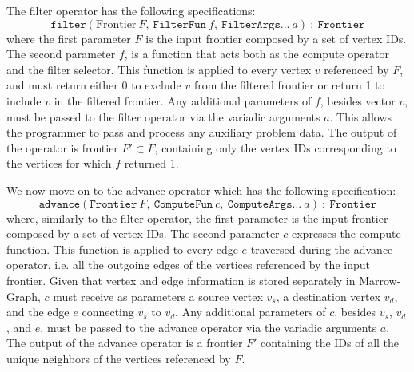 The filter operator has the following specifications:
%
\begin{displaymath}
\texttt{filter}(\text{Frontier} \: F, \: \texttt{FilterFun} \: f, \: \texttt{FilterArgs}... \: a) \: : \: \texttt{Frontier}
\end{displaymath}
%
where the first parameter $F$ is the input frontier composed by a set of vertex IDs. The second parameter $f$, is a function that acts both as the compute operator and the filter selector. This function is applied to every vertex $v$ referenced by $F$, and must return either 0 to exclude $v$ from the filtered frontier or return 1 to include $v$ in the filtered frontier. Any additional parameters of $f$, besides vector $v$, must be passed to the filter operator via the variadic arguments $a$. This allows the programmer to pass and process any auxiliary problem data. The output of the operator is frontier $F' \subset F$, containing only the vertex IDs corresponding to the vertices for which $f$ returned 1.

We now move on to the advance operator which has the following specification:
%
\begin{displaymath}
\texttt{advance}(\texttt{Frontier} \: F, \: \texttt{ComputeFun} \: c, \: \texttt{ComputeArgs}... \: a) \: : \: \texttt{Frontier}
\end{displaymath}
%
where, similarly to the filter operator, the first parameter is the input frontier composed by a set of vertex IDs. The second parameter $c$ expresses the compute function. This function is applied to every edge $e$ traversed during the advance operator, i.e. all the outgoing edges of the vertices referenced by the input frontier.
Given that vertex and edge information is stored separately in Marrow-Graph, $c$ must receive as parameters a source vertex $v_s$, a destination vertex $v_d$, and the edge $e$ connecting $v_s$ to $v_d$. 
Any additional parameters of $c$, besides $v_s$, $v_d$, and $e$, must be passed to the advance operator via the variadic arguments $a$. The output of the advance operator is a frontier $F'$ containing the IDs of all the unique neighbors of the vertices referenced by $F$.


